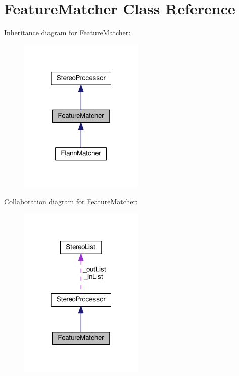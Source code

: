 \hypertarget{classFeatureMatcher}{}\section{Feature\+Matcher Class Reference}
\label{classFeatureMatcher}


Inheritance diagram for Feature\+Matcher\+:\nopagebreak
\begin{figure}[H]
\begin{center}
\leavevmode
\includegraphics[width=169pt]{classFeatureMatcher__inherit__graph}
\end{center}
\end{figure}


Collaboration diagram for Feature\+Matcher\+:\nopagebreak
\begin{figure}[H]
\begin{center}
\leavevmode
\includegraphics[width=169pt]{classFeatureMatcher__coll__graph}
\end{center}
\end{figure}
